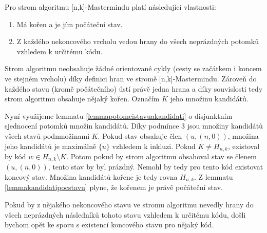 \begin{tvrz}
    Pro strom algoritmu [n,k]-Mastermindu platí následující vlastnosti:
    \begin{enumerate}
        \item Má kořen a je jím počáteční stav. 
        \item Z každého nekoncového vrcholu vedou hrany do všech neprázdných potomků vzhledem k určitému kódu.
    \end{enumerate}
    
\end{tvrz}
\begin{dukaz}
    Strom algoritmu neobsahuje žádné orientované cykly (cesty se začátkem i koncem ve stejném vrcholu) díky definici hran ve stromě [n,k]-Mastermindu. Zároveň do každého stavu (kromě počátečního) ústí právě jedna hrana a díky souvislosti tedy strom algoritmu obsahuje nějaký kořen. Označím $K$ jeho množinu kandidátů.

    Nyní využijeme lemmatu \ref{lemmapotomcistavuakandidati} o disjunktním sjednocení potomků množin kandidátů. Díky podmínce $3$ jsou množiny kandidátů všech stavů podmnožinami $K$. Pokud stav obsahuje člen $(u, (n,0))$, množina jeho kandidátů je maximálně $\{u\}$ vzhledem k inkluzi. Pokud $K \neq H_{n,k}$, existoval by kód $w \in H_{n,k} \setminus K$. Potom pokud by strom algoritmu obsahoval stav se členem $(u, (n,0))$, tento stav by byl prázdný. Nemohl by tedy pro tento kód existovat koncový stav. Množina kandidátů kořene je tedy rovna $H_{n,k}$. Z lemmatu \ref{lemmakandidatipocstavu} plyne, že kořenem je právě počáteční stav. 

    Pokud by z nějakého nekoncového stavu ve stromu algoritmu nevedly hrany do všech neprázdných následníků tohoto stavu vzhledem k určitému kódu, došli bychom opět ke sporu s existencí koncového stavu pro nějaký kód. 
    
    
    

\end{dukaz}

